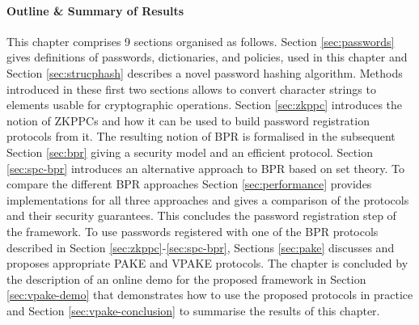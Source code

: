 \paragraph{Outline \& Summary of Results}
This chapter comprises 9 sections organised as follows.
Section \ref{sec:passwords} gives definitions of passwords, dictionaries, and policies, used in this chapter and Section \ref{sec:strucphash} describes a novel password hashing algorithm.
Methods introduced in these first two sections allows to convert character strings to elements usable for cryptographic operations.
Section \ref{sec:zkppc} introduces the notion of \acp{ZKPPC} and how it can be used to build password registration protocols from it.
The resulting notion of \ac{BPR} is formalised in the subsequent Section \ref{sec:bpr} giving a security model and an efficient protocol.
Section \ref{sec:spc-bpr} introduces an alternative approach to \ac{BPR} based on set theory.
To compare the different \ac{BPR} approaches Section \ref{sec:performance} provides implementations for all three approaches and gives a comparison of the protocols and their security guarantees.
This concludes the password registration step of the framework.
To use passwords registered with one of the \ac{BPR} protocols described in Section \ref{sec:zkppc}-\ref{sec:spc-bpr}, Sections \ref{sec:pake} discusses and proposes appropriate \ac{PAKE} and \ac{VPAKE} protocols.
The chapter is concluded by the description of an online demo for the proposed framework in Section \ref{sec:vpake-demo} that demonstrates how to use the proposed protocols in practice and Section \ref{sec:vpake-conclusion} to summarise the results of this chapter.















